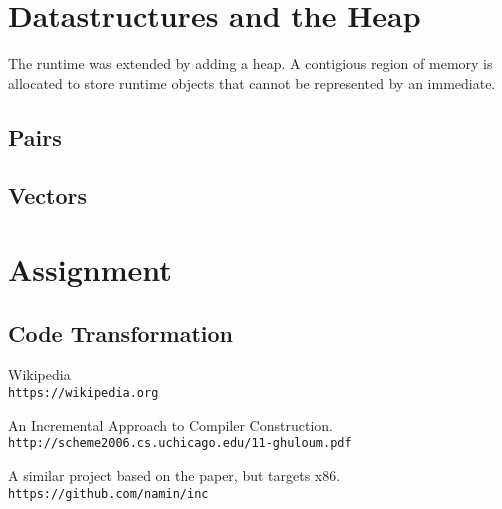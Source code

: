 \documentclass{article}
\begin{document}
\section{Datastructures and the Heap}

The runtime was extended by adding a heap. A contigious region of memory is allocated to store runtime objects that cannot be represented by an immediate. 

\subsection{Pairs}

\subsection{Vectors}

\section{Assignment}

\subsection{Code Transformation}



\begin{thebibliography}{5}

Wikipedia
\\\texttt{https://wikipedia.org}

An Incremental Approach to Compiler Construction.
\\\texttt{http://scheme2006.cs.uchicago.edu/11-ghuloum.pdf}

\bibitem{}
A similar project based on the paper, but targets x86.
\\\texttt{https://github.com/namin/inc}

\end{thebibliography}  
\end{document}

